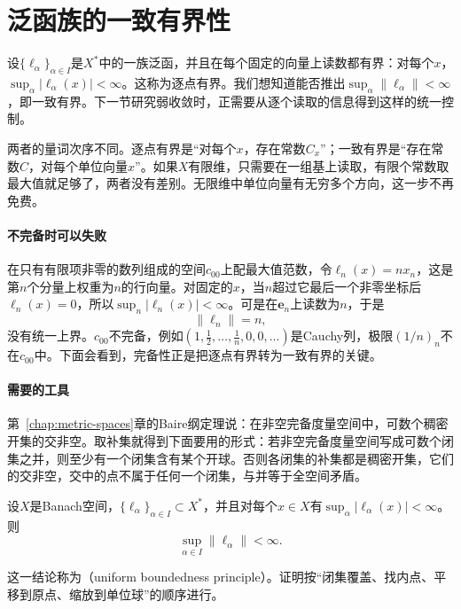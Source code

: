 \section{泛函族的一致有界性}
\label{sec:lfunc-uniform-boundedness}

设$\{\ell_\alpha\}_{\alpha\in I}$是$X^*$中的一族泛函，并且在每个固定的向量上读数都有界：对每个$x$，$\sup_\alpha\lvert\ell_\alpha(x)\rvert<\infty$。这称为逐点有界。我们想知道能否推出$\sup_\alpha\lVert\ell_\alpha\rVert<\infty$，即一致有界。下一节研究弱收敛时，正需要从逐个读取的信息得到这样的统一控制。

两者的量词次序不同。逐点有界是“对每个$x$，存在常数$C_x$”；一致有界是“存在常数$C$，对每个单位向量$x$”。如果$X$有限维，只需要在一组基上读取，有限个常数取最大值就足够了，两者没有差别。无限维中单位向量有无穷多个方向，这一步不再免费。

\paragraph{不完备时可以失败}
在只有有限项非零的数列组成的空间$c_{00}$上配最大值范数，令$\ell_n(x)=nx_n$，这是第$n$个分量上权重为$n$的行向量。对固定的$x$，当$n$超过它最后一个非零坐标后$\ell_n(x)=0$，所以$\sup_n\lvert\ell_n(x)\rvert<\infty$。可是在$\bm e_n$上读数为$n$，于是
\[
\lVert\ell_n\rVert=n ,
\]
没有统一上界。$c_{00}$不完备，例如$(1,\tfrac12,\ldots,\tfrac1n,0,0,\ldots)$是Cauchy列，极限$(1/n)_n$不在$c_{00}$中。下面会看到，完备性正是把逐点有界转为一致有界的关键。

\paragraph{需要的工具}
第~\ref{chap:metric-spaces}章的Baire纲定理说：在非空完备度量空间中，可数个稠密开集的交非空。取补集就得到下面要用的形式：若非空完备度量空间写成可数个闭集之并，则至少有一个闭集含有某个开球。否则各闭集的补集都是稠密开集，它们的交非空，交中的点不属于任何一个闭集，与并等于全空间矛盾。

\begin{theorem}[泛函的一致有界原理]
\label{thm:lfunc-uniform-boundedness}
设$X$是Banach空间，$\{\ell_\alpha\}_{\alpha\in I}\subset X^*$，并且对每个$x\in X$有$\sup_\alpha\lvert\ell_\alpha(x)\rvert<\infty$。则
\begin{equation}
\sup_{\alpha\in I}\lVert\ell_\alpha\rVert<\infty .
\label{eq:lfunc-uniform-bound}
\end{equation}
\end{theorem}

这一结论称为（uniform boundedness principle）。证明按“闭集覆盖、找内点、平移到原点、缩放到单位球”的顺序进行。

